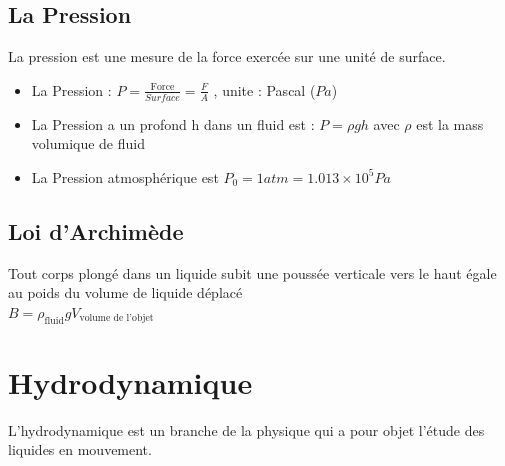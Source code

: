 \documentclass[12pt,oneside]{book}
\begin{document}
\subsection{La Pression}
La pression est une mesure de la force exercée sur une unité de surface. 
\begin{itemize}
	\item La Pression : $ P =\frac{\text{Force}}{Surface} =\frac{F}{A} $ , unite : Pascal ($Pa$)  \\
	\item La Pression a un profond h dans un fluid est : $ P = \rho g h $ avec $ \rho $ est la mass volumique de fluid \\
	\item La Pression atmosphérique est $ P_0 = 1 atm =1.013\times 10^5 Pa $
\end{itemize}
\subsection{Loi d’Archimède}
Tout corps plongé dans un liquide subit une poussée verticale vers le haut égale au poids du volume de liquide déplacé \\
$ B = \rho_\text{fluid}gV_\text{volume de l'objet} $
\section{Hydrodynamique}
L'hydrodynamique est un branche de la physique qui a pour objet l'étude des liquides en mouvement.
\end{document}
